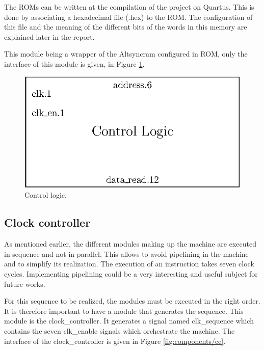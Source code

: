 The ROMs can be written at the compilation of the project on Quartus. This is done by associating a
hexadecimal file (.hex) to the ROM. The configuration of this file and the meaning of the different 
bits of the words in this memory are explained later in the report. 

This module being a wrapper of the Altsyncram configured in ROM, only the interface of this 
module is given, in Figure \ref{fig:components/cl}.

\begin{figure}[H]
    \centering
    \includegraphics[scale=1]{Chapter3-CPU/res/control_logic}
    \caption{Control logic.}
    \label{fig:components/cl}
\end{figure}

\subsection{Clock controller}

As mentioned earlier, the different modules making up the machine are executed in sequence and not 
in parallel. This allows to avoid pipelining in the machine and to simplify its realization. The 
execution of an instruction takes seven clock cycles. Implementing pipelining could be a very interesting 
and useful subject for future works. 

For this sequence to be realized, the modules must be executed in the right order. It is therefore 
important to have a module that generates the sequence. This module is the clock\_controller. It
generates a signal named clk\_sequence which contains the seven clk\_enable signals which orchestrate the machine. The interface of the clock\_controller is given in
Figure \ref{fig:components/cc}. 

